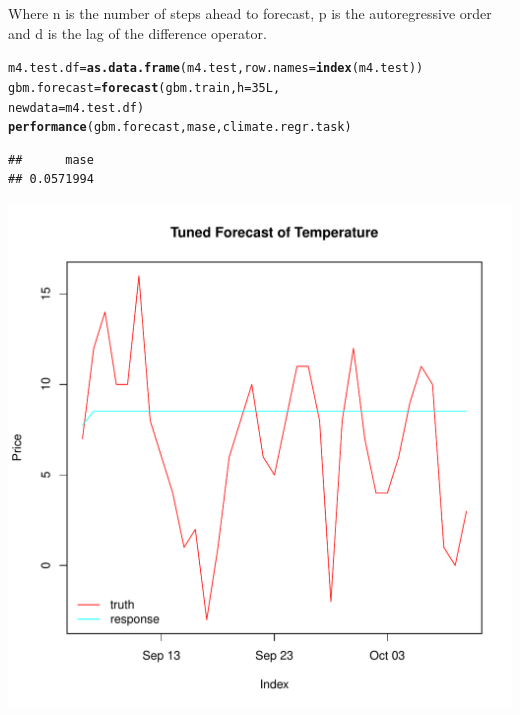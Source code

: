 \documentclass{article}\usepackage[]{graphicx}\usepackage[]{color}
\makeatletter
\def\maxwidth{ %
  \ifdim\Gin@nat@width>\linewidth
    \linewidth
  \else
    \Gin@nat@width
  \fi
}
\newcommand{\hlnum}[1]{\textcolor[rgb]{0.686,0.059,0.569}{#1}}%
\newcommand{\hlstd}[1]{\textcolor[rgb]{0.345,0.345,0.345}{#1}}%
\newcommand{\hlkwb}[1]{\textcolor[rgb]{0.69,0.353,0.396}{#1}}%
\newcommand{\hlkwc}[1]{\textcolor[rgb]{0.333,0.667,0.333}{#1}}%
\newcommand{\hlkwd}[1]{\textcolor[rgb]{0.737,0.353,0.396}{\textbf{#1}}}%
\newenvironment{kframe}{%
 \def\at@end@of@kframe{}%
 \ifinner\ifhmode%
  \def\at@end@of@kframe{\end{minipage}}%
  \begin{minipage}{\columnwidth}%
 \fi\fi%
 \def\FrameCommand##1{\hskip\@totalleftmargin \hskip-\fboxsep
 \colorbox{shadecolor}{##1}\hskip-\fboxsep
     \hskip-\linewidth \hskip-\@totalleftmargin \hskip\columnwidth}%
 \MakeFramed {\advance\hsize-\width
   \@totalleftmargin\z@ \linewidth\hsize
   \@setminipage}}%
 {\par\unskip\endMakeFramed%
 \at@end@of@kframe}
\newenvironment{knitrout}{}{} %
\theoremstyle{definition}
\makeatother
\begin{document}
Where n is the number of steps ahead to forecast, p is the autoregressive order and d is the lag of the difference operator.

\begin{knitrout}
\color{fgcolor}\begin{kframe}
\begin{alltt}
\hlstd{m4.test.df} \hlkwb{=} \hlkwd{as.data.frame}\hlstd{(m4.test,}\hlkwc{row.names} \hlstd{=} \hlkwd{index}\hlstd{(m4.test))}
\hlstd{gbm.forecast} \hlkwb{=} \hlkwd{forecast}\hlstd{(gbm.train,} \hlkwc{h} \hlstd{=} \hlnum{35L}\hlstd{,}
                        \hlkwc{newdata} \hlstd{= m4.test.df)}
\hlkwd{performance}\hlstd{(gbm.forecast,mase,climate.regr.task)}
\end{alltt}
\begin{verbatim}
##      mase 
## 0.0571994
\end{verbatim}
\end{kframe}
\end{knitrout}

\begin{knitrout}
\color{fgcolor}
\includegraphics[width=\maxwidth]{figure/forecastgbmplot-1} 

\end{knitrout}
\end{document}
